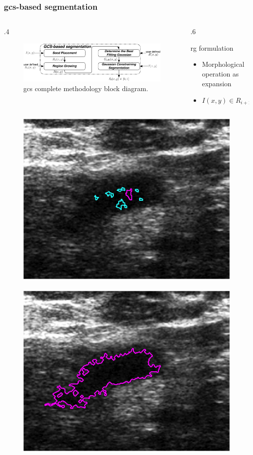 \begin{frame}\frametitle{\acs{gcs}-based segmentation}\tiny
\begin{columns}
\begin{column}{.4\textwidth}
\begin{figure}[Htb]%
\centering
\includegraphics[trim=2 0 2 2, clip,width=\textwidth]{IWDMmethodDiagram}
\caption{{\tiny \ac{gcs} complete methodology block diagram.}}
\label{fig:methodDiagram}
\end{figure}
\end{column}
\begin{column}{.6\textwidth}
\begin{block}{{\small \acf{rg} formulation}}
\begin{itemize}
\item Morphological operation as expansion
\item $I(x,y) \in R_{i+1} \iff I(x,y) \in \mu(I(R_i))\pm\frac{\sigma(I(R_i))}{2}$
\end{itemize}
\end{block}
\end{column}
\end{columns}
\centering
\vspace{-5pt}
\begin{figure}[Htbp]
\centering
\includegraphics[trim= 0 5 0 10, clip,height=.24\textwidth]{mscThesis/seeds.png}~
\includegraphics[trim= 0 5 0 10, clip,height=.24\textwidth]{mscThesis/region.png}~ 

\end{figure}
\end{frame}
